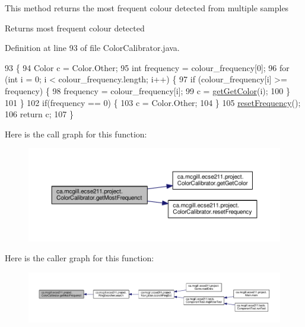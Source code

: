 This method returns the most frequent colour detected from multiple samples

\begin{DoxyReturn}{Returns}
most frequent colour detected 
\end{DoxyReturn}


Definition at line 93 of file Color\+Calibrator.\+java.


\begin{DoxyCode}
93                                          \{
94     Color c = Color.Other;
95     \textcolor{keywordtype}{int} frequency = colour\_frequency[0];
96     \textcolor{keywordflow}{for} (\textcolor{keywordtype}{int} i = 0; i < colour\_frequency.length; i++) \{
97       \textcolor{keywordflow}{if} (colour\_frequency[i] >= frequency) \{
98         frequency = colour\_frequency[i];
99         c = \hyperlink{classca_1_1mcgill_1_1ecse211_1_1project_1_1_color_calibrator_acb1d9cef0739971dbe00cc16712be0fe}{getGetColor}(i);
100       \}
101     \}
102     \textcolor{keywordflow}{if}(frequency == 0) \{
103       c = Color.Other;
104     \}
105     \hyperlink{classca_1_1mcgill_1_1ecse211_1_1project_1_1_color_calibrator_ab6148d75e3a105016580e90ed1ea9bc9}{resetFrequency}();
106     \textcolor{keywordflow}{return} c;
107   \}
\end{DoxyCode}
Here is the call graph for this function\+:
\nopagebreak
\begin{figure}[H]
\begin{center}
\leavevmode
\includegraphics[width=350pt]{classca_1_1mcgill_1_1ecse211_1_1project_1_1_color_calibrator_a3d65927aaa2041f933dbdc19c3d2a412_cgraph}
\end{center}
\end{figure}
Here is the caller graph for this function\+:
\nopagebreak
\begin{figure}[H]
\begin{center}
\leavevmode
\includegraphics[width=350pt]{classca_1_1mcgill_1_1ecse211_1_1project_1_1_color_calibrator_a3d65927aaa2041f933dbdc19c3d2a412_icgraph}
\end{center}
\end{figure}

